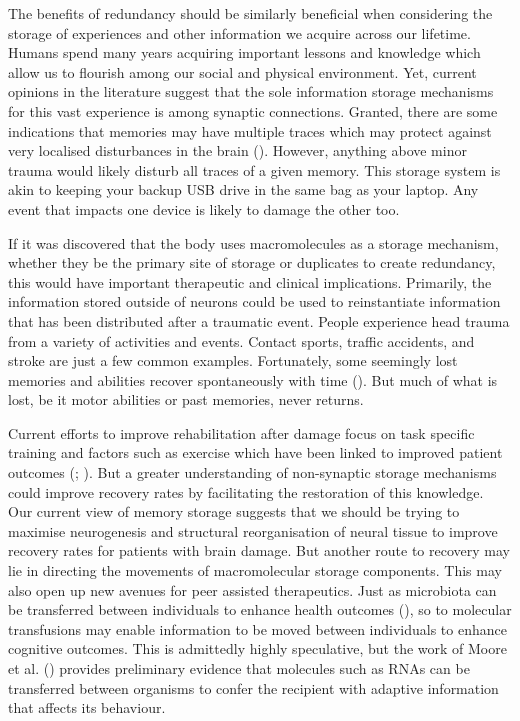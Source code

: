 \documentclass[
  jou,
  floatsintext,
  longtable,
  nolmodern,
  notxfonts,
  notimes,
  donotrepeattitle,
  colorlinks=true,linkcolor=blue,citecolor=blue,urlcolor=blue]{apa7}
\begin{document}
The benefits of redundancy should be similarly beneficial when
considering the storage of experiences and other information we acquire
across our lifetime. Humans spend many years acquiring important lessons
and knowledge which allow us to flourish among our social and physical
environment. Yet, current opinions in the literature suggest that the
sole information storage mechanisms for this vast experience is among
synaptic connections. Granted, there are some indications that memories
may have multiple traces which may protect against very localised
disturbances in the brain (). However, anything above minor trauma would likely disturb
all traces of a given memory. This storage system is akin to keeping
your backup USB drive in the same bag as your laptop. Any event that
impacts one device is likely to damage the other too.

If it was discovered that the body uses macromolecules as a storage
mechanism, whether they be the primary site of storage or duplicates to
create redundancy, this would have important therapeutic and clinical
implications. Primarily, the information stored outside of neurons could
be used to reinstantiate information that has been distributed after a
traumatic event. People experience head trauma from a variety of
activities and events. Contact sports, traffic accidents, and stroke are
just a few common examples. Fortunately, some seemingly lost memories
and abilities recover spontaneously with time
(). But
much of what is lost, be it motor abilities or past memories, never
returns.

Current efforts to improve rehabilitation after damage focus on task
specific training and factors such as exercise which have been linked to
improved patient outcomes (; ). But a
greater understanding of non-synaptic storage mechanisms could improve
recovery rates by facilitating the restoration of this knowledge. Our
current view of memory storage suggests that we should be trying to
maximise neurogenesis and structural reorganisation of neural tissue to
improve recovery rates for patients with brain damage. But another route
to recovery may lie in directing the movements of macromolecular storage
components. This may also open up new avenues for peer assisted
therapeutics. Just as microbiota can be transferred between individuals
to enhance health outcomes (), so to molecular transfusions may enable information to
be moved between individuals to enhance cognitive outcomes. This is
admittedly highly speculative, but the work of Moore et al.
() provides preliminary evidence
that molecules such as RNAs can be transferred between organisms to
confer the recipient with adaptive information that affects its
behaviour.
\end{document}
